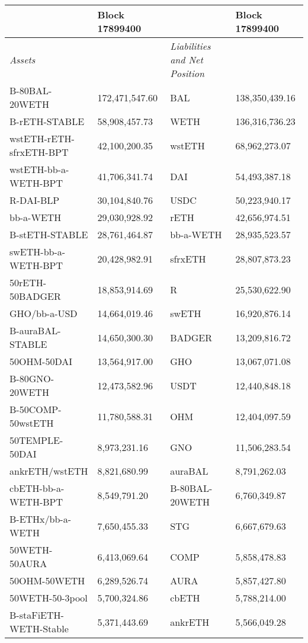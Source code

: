 
\begin{longtable}{@{}p{0.25\linewidth}p{0.25\linewidth}p{0.25\linewidth}p{0.25\linewidth}@{}}

\toprule


& Block 17899400 & & Block 17899400 \\

\midrule
\textit{Assets} & & \textit{Liabilities and Net Position} \\
B-80BAL-20WETH & 172,471,547.60 & BAL &138,350,439.16 \\
B-rETH-STABLE & 58,908,457.73 & WETH &136,316,736.23 \\
wstETH-rETH-sfrxETH-BPT & 42,100,200.35 & wstETH &68,962,273.07 \\
wstETH-bb-a-WETH-BPT & 41,706,341.74 & DAI &54,493,387.18 \\
R-DAI-BLP & 30,104,840.76 & USDC &50,223,940.17 \\
bb-a-WETH & 29,030,928.92 & rETH &42,656,974.51 \\
B-stETH-STABLE & 28,761,464.87 & bb-a-WETH &28,935,523.57 \\
swETH-bb-a-WETH-BPT & 20,428,982.91 & sfrxETH &28,807,873.23 \\
50rETH-50BADGER & 18,853,914.69 & R &25,530,622.90 \\
GHO/bb-a-USD & 14,664,019.46 & swETH &16,920,876.14 \\
B-auraBAL-STABLE & 14,650,300.30 & BADGER &13,209,816.72 \\
50OHM-50DAI & 13,564,917.00 & GHO &13,067,071.08 \\
B-80GNO-20WETH & 12,473,582.96 & USDT &12,440,848.18 \\
B-50COMP-50wstETH & 11,780,588.31 & OHM &12,404,097.59 \\
50TEMPLE-50DAI & 8,973,231.16 & GNO &11,506,283.54 \\
ankrETH/wstETH & 8,821,680.99 & auraBAL &8,791,262.03 \\
cbETH-bb-a-WETH-BPT & 8,549,791.20 & B-80BAL-20WETH &6,760,349.87 \\
B-ETHx/bb-a-WETH  & 7,650,455.33 & STG &6,667,679.63 \\
50WETH-50AURA & 6,413,069.64 & COMP &5,858,478.83 \\
50OHM-50WETH & 6,289,526.74 & AURA &5,857,427.80 \\
50WETH-50-3pool & 5,700,324.86 & cbETH &5,788,214.00 \\
B-staFiETH-WETH-Stable & 5,371,443.69 & ankrETH &5,566,049.28 \\

\end{longtable}
